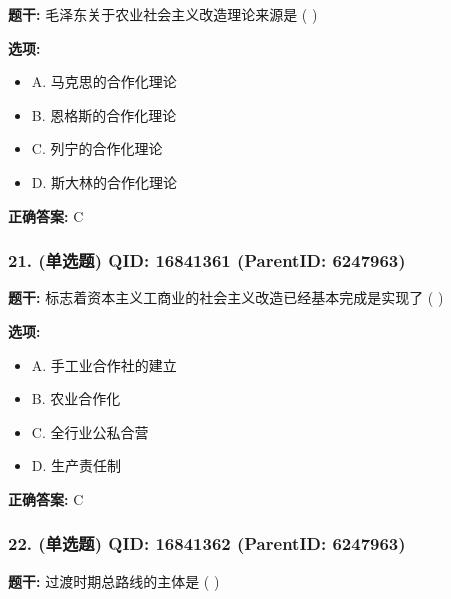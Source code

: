\documentclass[12pt,UTF8]{ctexart}
\begin{document}
\textbf{题干:}
毛泽东关于农业社会主义改造理论来源是 ( )



\textbf{选项:}
\begin{itemize}[leftmargin=*]

  \item A. 马克思的合作化理论

  \item B. 恩格斯的合作化理论

  \item C. 列宁的合作化理论

  \item D. 斯大林的合作化理论

\end{itemize}

\textbf{正确答案:}
C

\vspace{0.3em}\hrulefill\vspace{0.7em}

\subsubsection*{21. (单选题) \small QID: 16841361 (ParentID: 6247963)}

\textbf{题干:}
标志着资本主义工商业的社会主义改造已经基本完成是实现了 ( )



\textbf{选项:}
\begin{itemize}[leftmargin=*]

  \item A. 手工业合作社的建立

  \item B. 农业合作化

  \item C. 全行业公私合营

  \item D. 生产责任制

\end{itemize}

\textbf{正确答案:}
C

\vspace{0.3em}\hrulefill\vspace{0.7em}

\subsubsection*{22. (单选题) \small QID: 16841362 (ParentID: 6247963)}

\textbf{题干:}
过渡时期总路线的主体是 ( )
\end{document}
